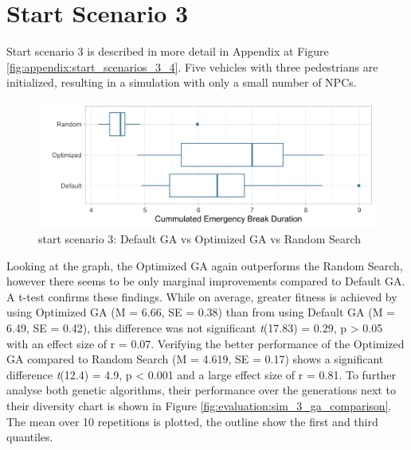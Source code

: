 \section{Start Scenario 3}
\label{sect:evaluation:scenario_3}
Start scenario 3 is described in more detail in Appendix at Figure \ref{fig:appendix:start_scenarios_3_4}. Five vehicles with three pedestrians are initialized, resulting in a simulation with only a small number of NPCs.

\begin{figure}[ht] 
	\includegraphics[width=1\linewidth]{simulations/evaluation/plots/sim_3_comparison}
	\caption{start scenario 3: Default GA vs Optimized GA vs Random Search}
	\label{fig:evaluation:sim_3_comparison}
\end{figure}

Looking at the graph, the Optimized GA again outperforms the Random Search, however there seems to be only marginal improvements compared to Default GA. A t-test confirms these findings. While on average, greater fitness is achieved by using Optimized GA (M = 6.66, SE = 0.38) than from using Default GA (M = 6.49, SE = 0.42), this difference was not significant \textit{t}(17.83) = 0.29, p > 0.05 with an effect size of r = 0.07. Verifying the better performance of the Optimized GA compared to Random Search (M = 4.619, SE = 0.17) shows a significant difference \textit{t}(12.4) = 4.9, p < 0.001 and a large effect size of r = 0.81. To further analyse both genetic algorithms, their performance over the generations next to their diversity chart is shown in Figure \ref{fig:evaluation:sim_3_ga_comparison}. The mean over 10 repetitions is plotted, the outline show the first and third quantiles.

